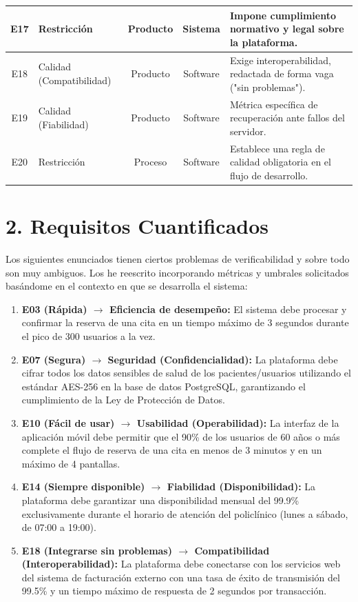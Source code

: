\documentclass[12pt,a4paper]{article}
\begin{document}
\begin{longtable}{|c|p{3.5cm}|c|c|p{5cm}|}
E17 & Restricción & Producto & Sistema & Impone cumplimiento normativo y legal sobre la plataforma. \\ \hline
E18 & Calidad (Compatibilidad) & Producto & Software & Exige interoperabilidad, redactada de forma vaga ("sin problemas"). \\ \hline
E19 & Calidad (Fiabilidad) & Producto & Software & Métrica específica de recuperación ante fallos del servidor. \\ \hline
E20 & Restricción & Proceso & Software & Establece una regla de calidad obligatoria en el flujo de desarrollo. \\
\end{longtable}

\section*{2. Requisitos Cuantificados}

Los siguientes enunciados tienen ciertos problemas de verificabilidad y sobre todo son muy ambiguos. Los he reescrito incorporando métricas y umbrales solicitados basándome en el contexto en que se desarrolla el sistema:

\begin{enumerate}
    \item \textbf{E03 (Rápida) $\rightarrow$ Eficiencia de desempeño:} 
    El sistema debe procesar y confirmar la reserva de una cita en un tiempo máximo de 3 segundos durante el pico de 300 usuarios a la vez.
    
    \item \textbf{E07 (Segura) $\rightarrow$ Seguridad (Confidencialidad):} 
    La plataforma debe cifrar todos los datos sensibles de salud de los pacientes/usuarios utilizando el estándar AES-256 en la base de datos PostgreSQL, garantizando el cumplimiento de la Ley de Protección de Datos.
    
    \item \textbf{E10 (Fácil de usar) $\rightarrow$ Usabilidad (Operabilidad):} 
    La interfaz de la aplicación móvil debe permitir que el 90\% de los usuarios de 60 años o más complete el flujo de reserva de una cita en menos de 3 minutos y en un máximo de 4 pantallas.
    
    \item \textbf{E14 (Siempre disponible) $\rightarrow$ Fiabilidad (Disponibilidad):} 
    La plataforma debe garantizar una disponibilidad mensual del 99.9\% exclusivamente durante el horario de atención del policlínico (lunes a sábado, de 07:00 a 19:00).
    
    \item \textbf{E18 (Integrarse sin problemas) $\rightarrow$ Compatibilidad (Interoperabilidad):} 
    La plataforma debe conectarse con los servicios web del sistema de facturación externo con una tasa de éxito de transmisión del 99.5\% y un tiempo máximo de respuesta de 2 segundos por transacción.
\end{enumerate}
\end{document}

